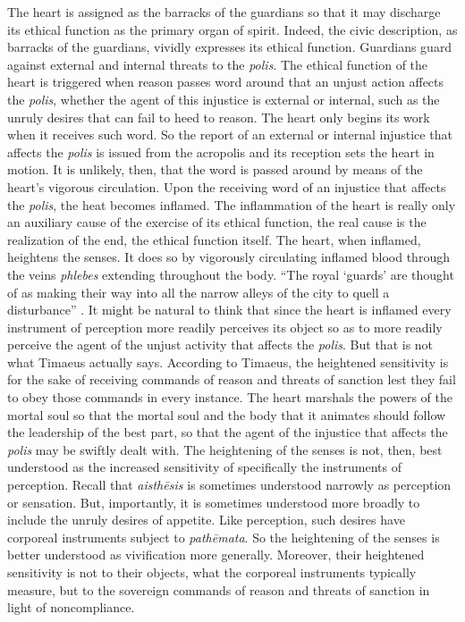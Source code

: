 The heart is assigned as the barracks of the guardians so that it may discharge its ethical function as the primary organ of spirit. Indeed, the civic description, as barracks of the guardians, vividly expresses its ethical function. Guardians guard against external and internal threats to the \emph{polis}. The ethical function of the heart is triggered when reason passes word around that an unjust action affects the \emph{polis}, whether the agent of this injustice is external or internal, such as the unruly desires that can fail to heed to reason. The heart only begins its work when it receives such word. So the report of an external or internal injustice that affects the \emph{polis} is issued from the acropolis and its reception sets the heart in motion. It is unlikely, then, that the word is passed around by means of the heart's vigorous circulation. Upon the receiving word of an injustice that affects the \emph{polis}, the heat becomes inflamed. The inflammation of the heart is really only an auxiliary cause of the exercise of its ethical function, the real cause is the realization of the end, the ethical function itself. The heart, when inflamed, heightens the senses. It does so by vigorously circulating inflamed blood through the veins \emph{phlebes} extending throughout the body. ``The royal `guards' are thought of as making their way into all the narrow alleys of the city to quell a disturbance'' \citep[503]{Taylor:1928qb}. It might be natural to think that since the heart is inflamed every instrument of perception more readily perceives its object so as to more readily perceive the agent of the unjust activity that affects the \emph{polis}. But that is not what Timaeus actually says. According to Timaeus, the heightened sensitivity is for the sake of receiving commands of reason and threats of sanction lest they fail to obey those commands in every instance. The heart marshals the powers of the mortal soul so that the mortal soul and the body that it animates should follow the leadership of the best part, so that the agent of the injustice that affects the \emph{polis} may be swiftly dealt with. The heightening of the senses is not, then, best understood as the increased sensitivity of specifically the instruments of perception. Recall that \emph{aisthēsis} is sometimes understood narrowly as perception or sensation. But, importantly, it is sometimes understood more broadly to include the unruly desires of appetite. Like perception, such desires have corporeal instruments subject to \emph{pathēmata}. So the heightening of the senses is better understood as vivification more generally. Moreover, their heightened sensitivity is not to their objects, what the corporeal instruments typically measure, but to the sovereign commands of reason and threats of sanction in light of noncompliance. 

